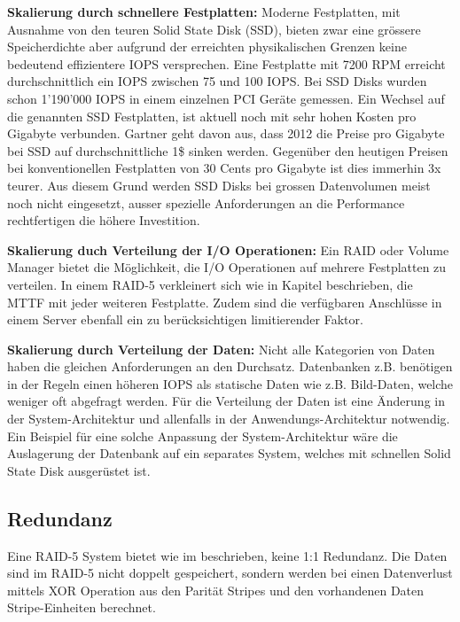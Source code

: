 \textbf{Skalierung durch schnellere Festplatten:}
Moderne Festplatten, mit Ausnahme von den teuren Solid State Disk (SSD), bieten zwar eine grössere Speicherdichte aber aufgrund der erreichten physikalischen Grenzen keine bedeutend effizientere IOPS versprechen. Eine Festplatte mit 7200 RPM erreicht durchschnittlich ein IOPS zwischen 75 und 100 IOPS. Bei SSD Disks wurden schon 1'190'000 IOPS in einem einzelnen PCI Geräte gemessen.\cite{Symantec2011} \cite{Fusionio} 
Ein Wechsel auf die genannten SSD Festplatten, ist aktuell noch mit sehr hohen Kosten pro Gigabyte verbunden. Gartner geht davon aus, dass 2012 die Preise pro Gigabyte bei SSD auf durchschnittliche 1\$ sinken werden. Gegenüber den heutigen Preisen bei konventionellen Festplatten von 30 Cents pro Gigabyte ist dies immerhin 3x teurer. Aus diesem Grund werden SSD Disks bei grossen Datenvolumen meist noch nicht eingesetzt, ausser spezielle Anforderungen an die Performance rechtfertigen die höhere Investition. \cite{AgamShah2011}

\textbf{Skalierung duch Verteilung der I/O Operationen:}
Ein RAID oder Volume Manager bietet die Möglichkeit, die I/O Operationen auf mehrere Festplatten zu verteilen. In einem RAID-5 verkleinert sich wie in Kapitel  beschrieben, die MTTF mit jeder weiteren Festplatte. Zudem sind die verfügbaren Anschlüsse in einem Server ebenfall ein zu berücksichtigen limitierender Faktor.

\textbf{Skalierung durch Verteilung der Daten:}
Nicht alle Kategorien von Daten haben die gleichen Anforderungen an den Durchsatz. Datenbanken z.B. benötigen in der Regeln einen höheren IOPS als statische Daten wie z.B. Bild-Daten, welche weniger oft abgefragt werden. Für die Verteilung der Daten ist eine Änderung in der System-Architektur und allenfalls in der Anwendungs-Architektur notwendig. Ein Beispiel für eine solche Anpassung der System-Architektur wäre die Auslagerung der Datenbank auf ein separates System, welches mit schnellen Solid State Disk ausgerüstet ist. 

\subsection{Redundanz}
Eine RAID-5 System bietet wie im  beschrieben, keine 1:1 Redundanz. Die Daten sind im RAID-5 nicht doppelt gespeichert, sondern werden bei einen Datenverlust mittels XOR Operation aus den Parität Stripes und den vorhandenen Daten Stripe-Einheiten berechnet. 

